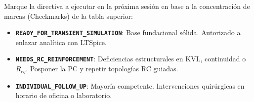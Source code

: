 \documentclass[11pt, a4paper]{article}
\begin{document}
\vspace{0.8cm}
\begin{tcolorbox}[colback=gray!5, colframe=gray!50, title=\textbf{Fallo Final (Status de Transición)}]
Marque la directiva a ejecutar en la próxima sesión en base a la concentración de marcas (Checkmarks) de la tabla superior:
\begin{itemize}
    \item[$\square$] \textbf{\texttt{READY\_FOR\_TRANSIENT\_SIMULATION}}: Base fundacional sólida. Autorizado a enlazar analítica con LTSpice.
    \item[$\square$] \textbf{\texttt{NEEDS\_RC\_REINFORCEMENT}}: Deficiencias estructurales en KVL, continuidad o $R_{eq}$. Posponer la PC y repetir topologías RC guiadas.
    \item[$\square$] \textbf{\texttt{INDIVIDUAL\_FOLLOW\_UP}}: Mayoría competente. Intervenciones quirúrgicas en horario de oficina o laboratorio.
\end{itemize}
\end{tcolorbox}
\end{document}
